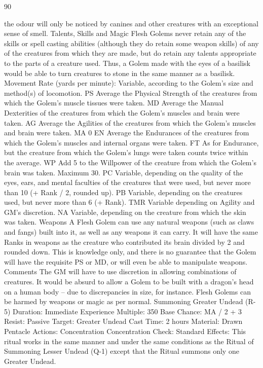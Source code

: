 \documentclass[a4paper]{article}
\begin{document}
\begin{multicols}{3}
90

the odour will only be noticed by canines and other
creatures with an exceptional sense of smell.
Talents, Skills and Magic Flesh Golems never
retain any of the skills or spell casting abilities
(although they do retain some weapon skills) of
any of the creatures from which they are made, but
do retain any talents appropriate to the parts of a
creature used. Thus, a Golem made with the eyes
of a basilisk would be able to turn creatures to
stone in the same manner as a basilisk.
Movement Rate (yards per minute): Variable,
according to the Golem’s size and method(s) of
locomotion.
PS Average the Physical Strength of the creatures
from which the Golem’s muscle tissues were taken.
MD Average the Manual Dexterities of the creatures from which the Golem’s muscles and brain
were taken.
AG Average the Agilities of the creatures from
which the Golem’s muscles and brain were taken.
MA 0
EN Average the Endurances of the creatures from
which the Golem’s muscles and internal organs
were taken.
FT As for Endurance, but the creature from which
the Golem’s lungs were taken counts twice within
the average.
WP Add 5 to the Willpower of the creature from
which the Golem’s brain was taken. Maximum 30.
PC Variable, depending on the quality of the eyes,
ears, and mental faculties of the creatures that were
used, but never more than 10 (+ Rank / 2, rounded
up).
PB Variable, depending on the creatures used, but
never more than 6 (+ Rank).
TMR Variable depending on Agility and GM’s
discretion.
NA Variable, depending on the creature from
which the skin was taken.
Weapons A Flesh Golem can use any natural
weapons (such as claws and fangs) built into it, as
well as any weapons it can carry. It will have the
same Ranks in weapons as the creature who contributed its brain divided by 2 and rounded down.
This is knowledge only, and there is no guarantee
that the Golem will have the requisite PS or MD,
or will even be able to manipulate weapons.
Comments The GM will have to use discretion in
allowing combinations of creatures. It would be
absurd to allow a Golem to be built with a dragon’s
head on a human body – due to discrepancies in
size, for instance. Flesh Golems can be harmed by
weapons or magic as per normal.
Summoning Greater Undead (R-5)
Duration: Immediate
Experience Multiple: 350
Base Chance: MA / 2 + 3%
Resist: Passive
Target: Greater Undead
Cast Time: 2 hours
Material: Drawn Pentacle
Actions: Concentration
Concentration Check: Standard
Effects: This ritual works in the same manner and
under the same conditions as the Ritual of Summoning Lesser Undead (Q-1) except that the Ritual
summons only one Greater Undead.


\end{multicols}
\end{document}
